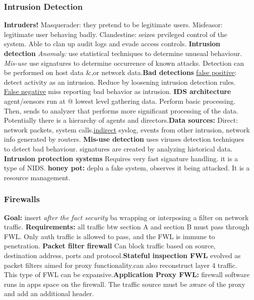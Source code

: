 \documentclass[a4paper,1pt]{article}
\begin{document}
\subsubsection{Intrusion Detection}
{\bf Intruders!} Masquerader: they pretend to be legitimate users. Misfeasor: legitimate user behaving badly. Clandestine: seizes prvileged control of the system. Able to clan up audit logs and evade access controls. {\bf Intrusion detection} \emph{Anomaly:} use statistical techniques to determine unusual behaviour. \emph{Mis-use} use signatures to determine occurrence of known attacks. Detection can be performed on host data \&,or network data.{\bf Bad detections} \underline{false positive}: detect activity as an intrusion. Reduce by loosening intrusion detection rules. \underline{False negative} miss reporting bad behavior as intrusion. {\bf IDS architecture} agent/sensors run at @ lowest level gathering data. Perform basic processing. Then, sends to analyzer that performs more significant processing of the data. Potentially there is a hierarchy of agents and directors.{\bf Data sources:} Direct: network packets, system calls.\underline{indirect} syslog, events from other intrusion, network info generated by routers. {\bf Mis-use detection} uses viruses detection techniques to detect bad behaviour. signatures are created by analyzing historical data. {\bf Intrusion protection systems} Requires very fast signature handling. it is a type of NIDS. {\bf honey pot:} deplu a fake system, observes it being attacked. It is a resource management. 
\subsubsection{Firewalls}
{\bf Goal:} insert \emph{after the fact security} ba wrapping or interposing a filter on network traffic. {\bf Requirements:} all traffic btw section A and section B must pass through FWL. Only auth traffic is allowed to pass, and the FWL is immune to penetration. {\bf Packet filter firewall} Can block traffic based on source, destination address, ports and protocol.{\bf Stateful inspection FWL} evolved as packet filters aimed for proxy functionality.can also reconstruct layer 4 traffic. This type of FWL can be expansive.{\bf Application Proxy FWL:} firewall software runs in apps space on the firewall. The traffic source must be aware of the proxy and add an additional header. 
\end{document}
